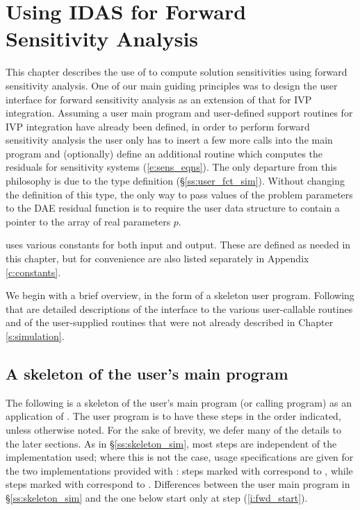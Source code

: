 \chapter{Using IDAS for Forward Sensitivity Analysis}\label{s:forward}

This chapter describes the use of {\idas} to compute solution sensitivities using
forward sensitivity analysis. One of our main guiding principles was to design 
the {\idas} user interface for forward sensitivity analysis as an extension of
that for IVP integration. Assuming a user main program and user-defined support 
routines for IVP integration have already been defined, in order to perform 
forward sensitivity analysis the user only has to insert a few more calls 
into the main program and (optionally) define an additional routine which
computes the residuals for sensitivity systems (\ref{e:sens_eqns}). 
The only departure from this philosophy is due to the  type definition
(\S\ref{ss:user_fct_sim}). Without changing the definition of this type, the
only way to pass values of the problem parameters to the DAE residual
function is to require the user data structure  to contain a pointer
to the array of real parameters $p$.

{\idas} uses various constants for both input and output.  These are
defined as needed in this chapter, but for convenience are also listed
separately in Appendix \ref{c:constants}.

We begin with a brief overview, in the form of a skeleton user program.
Following that are detailed descriptions of the interface to the
various user-callable routines and of the user-supplied routines that were not already
described in Chapter \ref{s:simulation}.

\section{A skeleton of the user's main program}\label{s:forward_usage}

The following is a skeleton of the user's main program (or calling
program) as an application of {\idas}. The user program is to have these 
steps in the order indicated, unless otherwise noted.
For the sake of brevity, we defer many of the details to the later sections.
As in \S\ref{ss:skeleton_sim}, most steps are independent of the {\nvector}
implementation used; where this is not the case, usage specifications are given for the
two implementations provided with {\idas}: steps marked with {\p} correspond to 
{\nvecp}, while steps marked with {\s} correspond to {\nvecs}.
Differences between the user main program in \S\ref{ss:skeleton_sim} and
the one below start only at step (\ref{i:fwd_start}).

